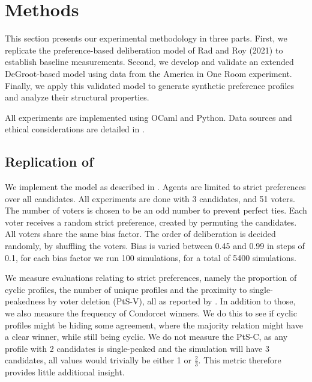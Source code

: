\chapter{Methods}
\label{Methods}



This section presents our experimental methodology in three parts. First, we
replicate the preference-based deliberation model of Rad and Roy (2021) to
establish baseline measurements. Second, we develop and validate an extended
DeGroot-based model using data from the America in One Room experiment.
Finally, we apply this validated model to generate synthetic preference
profiles and analyze their structural properties.

All experiments are
implemented using OCaml and Python. Data sources and ethical considerations are
detailed in .


\section{Replication of \citet{radDeliberationSinglePeakednessCoherent2021}}

We implement the model as described in . Agents are
limited to strict preferences over all candidates. All experiments are done
with 3 candidates, and 51 voters. The number of voters is chosen to be an odd
number to prevent perfect ties. Each voter receives a random strict preference,
created by permuting the candidates. All voters share the same bias
factor. The order of deliberation is decided randomly, by shuffling the voters.
Bias is varied between 0.45 and 0.99 in steps of 0.1, for each bias factor we run 100 simulations, for a total of 5400 simulations.


We measure evaluations relating to strict preferences, namely the
proportion of cyclic profiles, the number of unique profiles and the proximity
to single-peakedness by voter deletion (PtS-V), all as reported by
\citet{radDeliberationSinglePeakednessCoherent2021}. In addition to those, we
also measure the frequency of Condorcet winners. We do this to see if cyclic
profiles might be hiding some agreement, where the majority relation might have a clear winner, while still being cyclic. We do not measure the PtS-C, as any
profile with 2 candidates is single-peaked and the simulation will have 3
candidates, all values would trivially be either 1 or $\frac{2}{3}$.  This metric therefore
provides little additional insight.

